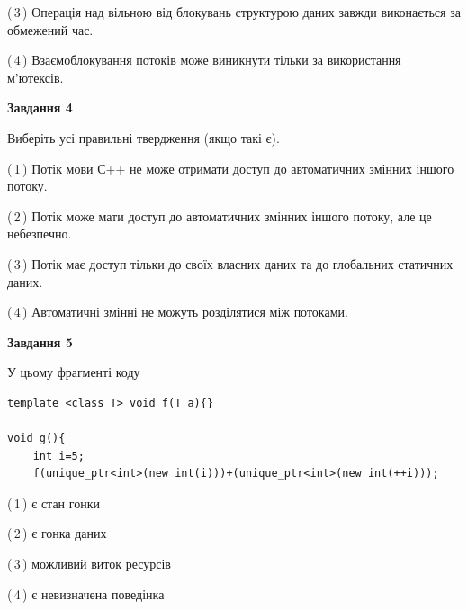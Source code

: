 \documentclass[12pt, ukrainian]{article}
\begin{document}
\begin {large}
{(\,3\,) Операція над вільною від блокувань структурою даних завжди виконається за обмежений час.%

(\,4\,) Взаємоблокування потоків може виникнути тільки за використання м’ютексів.%



\begin{center}
\textbf{Завдання 4}
\end{center}
Виберіть усі правильні твердження (якщо такі є).\par
\vspace{2mm}

(\,1\,) Потік мови С++ не може отримати доступ до автоматичних змінних іншого потоку.%

(\,2\,) Потік може мати доступ до автоматичних змінних іншого потоку, але це небезпечно.%

(\,3\,) Потік має доступ тільки до своїх власних даних та до глобальних статичних даних.%

(\,4\,) Автоматичні змінні не можуть розділятися між потоками.%



\begin{center}
\textbf{Завдання 5}
\end{center}
У цьому фрагменті коду
\begin{verbatim}
template <class T> void f(T a){}

void g(){
    int i=5;
    f(unique_ptr<int>(new int(i)))+(unique_ptr<int>(new int(++i)));
\end{verbatim}
(\,1\,) є стан гонки%

(\,2\,) є гонка даних%

(\,3\,) можливий виток ресурсів%

(\,4\,) є невизначена поведінка%


}
\end {large}
\end{document}
